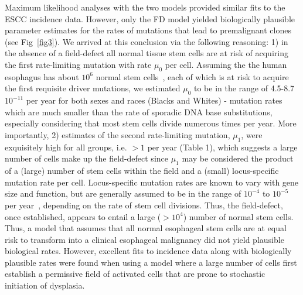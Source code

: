 \documentclass[10pt,letterpaper]{article}
\begin{document}
Maximum likelihood analyses with the two models provided similar fits to the ESCC incidence data. However, only the FD model yielded biologically plausible parameter estimates for the rates of mutations that lead to premalignant clones (see Fig~\ref{fig3}). We arrived at this conclusion via the following reasoning: 1) in the absence of a field-defect all normal tissue stem cells are at risk of acquiring the first rate-limiting mutation with rate $\mu_0$ per cell. Assuming the the human esophagus has about $10^6$ normal stem cells~\cite{Tomasetti2015}, each of which is at risk to acquire the first requisite driver mutations, we estimated $\mu_0$ to be in the range of 4.5-8.7 $10^{-11}$ per year for both sexes and races (Blacks and Whites) - mutation rates which are much smaller than the rate of sporadic DNA base substitutions, especially considering that most stem cells divide numerous times per year. More importantly, 2) estimates of the second rate-limiting mutation, $\mu_1$, were exquisitely high for all groups, i.e. $> 1$ per year (Table 1), which suggests a large number of cells make up the field-defect since $\mu_1$ may be considered the product of a (large) number of stem cells within the field and a (small) locus-specific mutation rate per cell. Locus-specific mutation rates are known to vary with gene size and function, but are generally assumed to be in the range of $10^{-4}$ to $10^{-5}$ per year~\cite{Drake1998}, depending on the rate of stem cell divisions. Thus, the field-defect, once established, appears to entail a large ($>10^4$) number of normal stem cells. Thus, a model that assumes that all normal esophageal stem cells are at equal risk to transform into a clinical esophageal malignancy did not yield plausible biological rates. However, excellent fits to incidence data along with biologically plausible rates were found when using a model where a large number of cells first establish a permissive field of activated cells that are prone to stochastic initiation of dysplasia.
\end{document}
